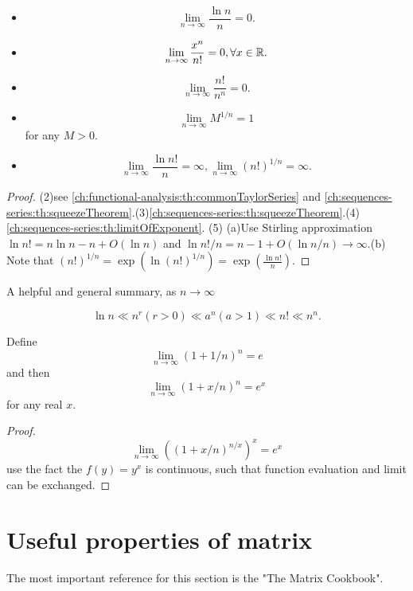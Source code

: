 \begin{refsection}
\begin{lemma}\label{appendix:th:commonLimitssummary}\hfill
\begin{itemize}
	\item $$\lim_{n\to \infty} \frac{\ln n}{n} = 0.$$
	\item 
	$$\lim_{n\to \infty} \frac{x^n}{n!} = 0, \forall x\in \mathbb{R}.$$
	\item 	$$\lim_{n\to\infty} \frac{n!}{n^n} = 0.$$
	\item $$\lim_{n\to \infty} M^{1/n} = 1$$ for any $M > 0$.
	\item $$\lim_{n\to\infty} \frac{\ln n!}{n} = \infty,\lim_{n\to\infty} (n!)^{1/n} = \infty.$$
\end{itemize}
\end{lemma}
\begin{proof}
(2)see \autoref{ch:functional-analysis:th:commonTaylorSeries} and \autoref{ch:sequences-series:th:squeezeTheorem}.(3)\autoref{ch:sequences-series:th:squeezeTheorem}.(4) \autoref{ch:sequences-series:th:limitOfExponent}.
(5) (a)Use Stirling approximation $\ln n! = n\ln n - n + O(\ln n)$ and $\ln n!/n = n - 1 + O(\ln n / n) \to \infty.$(b) Note that
 $(n!)^{1/n} = \exp(\ln (n!)^{1/n}) = \exp(\frac{\ln n!}{n}).$
\end{proof}

\begin{note}\label{appendix:th:sequenceGrowthRate}
A helpful and general summary, as $n\to \infty$

$$\ln n \ll n^r(r>0) \ll a^n (a>1) \ll n! \ll n^n.$$	
\end{note}


\begin{lemma}[property of e]\label{appendix:propertyofe}
Define
$$\lim_{n\to \infty} (1 + 1/n)^n = e$$
and then
$$\lim_{n\to \infty} (1 + x/n)^n = e^{x}$$
for any real $x$.
\end{lemma}
\begin{proof}
 $$\lim_{n\to \infty} ((1 + x/n)^{n/x})^x = e^{x}$$
use the fact the $f(y) = y^x$ is continuous, such that function evaluation and limit can be exchanged.	
\end{proof}



\section{Useful properties of matrix}
\begin{remark}[references]
	The most important reference for this section is the "The Matrix Cookbook".\cite{petersen3274matrix}
\end{remark}


\end{refsection}

